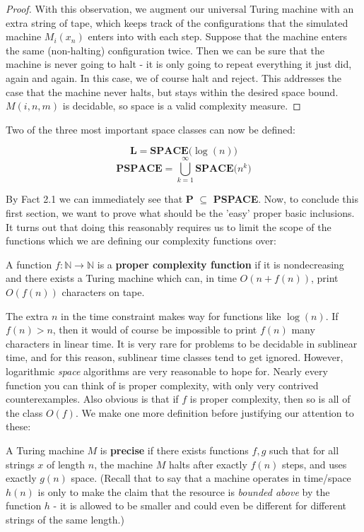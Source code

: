 \begin{proof}
	\par With this observation, we augment our universal Turing machine with an extra string of tape, which keeps track of the configurations that the simulated machine $M_i(x_n)$ enters into with each step. Suppose that the machine enters the same (non-halting) configuration twice. Then we can be sure that the machine is never going to halt - it is only going to repeat everything it just did, again and again. In this case, we of course halt and reject. This addresses the case that the machine never halts, but stays within the desired space bound. $M(i,n,m)$ is decidable, so space is a valid complexity measure.
\end{proof}
Two of the three most important space classes can now be defined:
\begin{definition}
\[ \textbf{L} = \textbf{SPACE($\log(n)$)} \]
\[ \textbf{PSPACE} = \bigcup_{k=1}^\infty \textbf{SPACE($n^k$)} \]
\end{definition}
By Fact 2.1 we can immediately see that \textbf{P} $\subseteq$ \textbf{PSPACE}.
Now, to conclude this first section, we want to prove what should be the 'easy' proper basic inclusions. It turns out that doing this reasonably requires us to limit the scope of the functions which we are defining our complexity functions over:
\begin{definition}
	A function $f:\mathbb{N} \to \mathbb{N}$ is a \textbf{proper complexity function} if it is nondecreasing and there exists a Turing machine which can, in time $O(n+f(n))$, print $O(f(n))$ characters on tape. 
\end{definition}
The extra $n$ in the time constraint makes way for functions like $\log(n)$. If $f(n) > n$, then it would of course be impossible to print $f(n)$ many characters in linear time. It is very rare for problems to be decidable in sublinear time, and for this reason, sublinear time classes tend to get ignored. However, logarithmic \textit{space} algorithms are very reasonable to hope for. Nearly every function you can think of is proper complexity, with only very contrived counterexamples. Also obvious is that if $f$ is proper complexity, then so is all of the class $O(f)$. We make one more definition before justifying our attention to these:
\begin{definition}
	A Turing machine $M$ is \textbf{precise} if there exists functions $f,g$ such that for all strings $x$ of length $n$, the machine $M$ halts after exactly $f(n)$ steps, and uses exactly $g(n)$ space. (Recall that to say that a machine operates in time/space $h(n)$ is only to make the claim that the resource is \textit{bounded above} by the function $h$ - it is allowed to be smaller and could even be different for different strings of the same length.)
\end{definition} 

